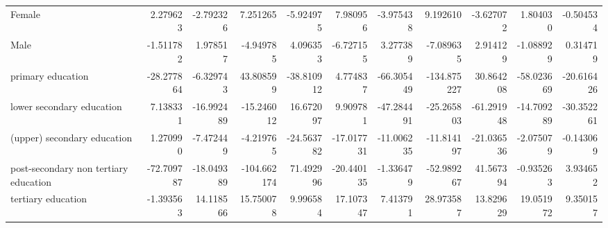 \documentclass{article}
\begin{document}
\begin{table}[!htbp]
{\begin{tabular}{lrrrrrrrrrr}
Female                                &    2.279623 &  -2.792326 &    7.251265 &  -5.924975 &   7.980956 &  -3.975438 &    9.192610 &  -3.627072 &   1.804030 &  -0.504534 \\
Male                                  &   -1.511782 &   1.978517 &   -4.949785 &   4.096353 &  -6.727155 &   3.277389 &   -7.089635 &   2.914129 &  -1.088929 &   0.314719 \\
primary education                     &  -28.277864 &  -6.329743 &   43.808599 & -38.810912 &   4.774837 & -66.305449 & -134.875227 &  30.864208 & -58.023669 & -20.616426 \\
lower secondary education             &    7.138331 & -16.992489 &  -15.246012 &  16.672097 &   9.909781 & -47.284491 &  -25.265803 & -61.291948 & -14.709289 & -30.352261 \\
(upper) secondary education           &    1.270990 &  -7.472449 &   -4.219765 & -24.563782 & -17.017731 & -11.006235 &  -11.814197 & -21.036536 &  -2.075079 &  -0.143069 \\
post-secondary non tertiary education &  -72.709787 & -18.049389 & -104.662174 &  71.492996 & -20.440135 &  -1.336479 &  -52.989267 &  41.567394 &  -0.935263 &   3.934652 \\
tertiary education                    &   -1.393563 &  14.118566 &   15.750078 &   9.996584 &  17.107347 &   7.413791 &   28.973587 &  13.829629 &  19.051972 &   9.350157 \\
\bottomrule
\end{tabular}
}
\end{table}
\end{document}

